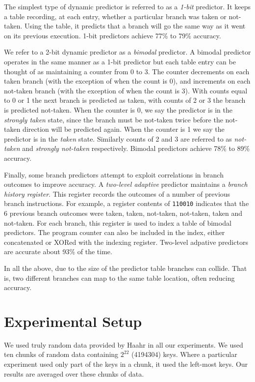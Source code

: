 \documentclass[acmtocl]{acmtrans2m}
\begin{document}
The simplest type of dynamic predictor is referred to as a \textit{1-bit}
predictor. It keeps a table recording, at each entry, whether a particular
branch was taken or not-taken.  Using the table, it predicts that a branch will
go the same way as it went on its previous execution. 1-bit predictors achieve
77\% to 79\% accuracy.

We refer to a 2-bit dynamic predictor as a \textit{bimodal} predictor. A bimodal
predictor operates in the same manner as a 1-bit predictor but each table entry
can be thought of  as maintaining a counter from 0 to 3. The counter decrements
on each taken branch (with the exception of when the count is 0), and increments
on each not-taken branch (with the exception of when the count is 3). With
counts equal to 0 or 1 the next branch is predicted as taken, with counts of 2
or 3 the branch is predicted not-taken.  When the counter is 0, we say the
predictor is in the \textit{strongly taken} state, since the branch must be
not-taken twice before the not-taken direction will be predicted again. When the
counter is 1 we say the predictor is in the \textit{taken} state. Similarly
counts of 2 and 3 are referred to as \textit{not-taken} and \textit{strongly
not-taken} respectively. Bimodal predictors achieve 78\% to 89\% accuracy.

Finally, some branch predictors attempt to exploit correlations in branch
outcomes to improve accuracy. A \textit{two-level adaptive} predictor maintains
a \textit{branch history register}. This register records the outcomes of a
number of previous branch instructions. For example, a register contents of
\texttt{110010} indicates that the 6 previous branch outcomes were taken, taken,
not-taken, not-taken, taken and not-taken.  For each branch, this register is
used to index a table of bimodal predictors.  The program counter can also be
included in the index, either concatenated or XORed with the indexing register.
Two-level adpative predictors are accurate about 93\% of the time.

In all the above, due to the size of the predictor table branches can collide.
That is, two different branches can map to the same table location, often
reducing accuracy.

\section{Experimental Setup}
 
We used truly random data provided by Haahr \citeyear{Random} in all our
experiments. We used ten chunks of random data containing $2^{22}$ (4194304)
keys.  Where a particular experiment used only part of the keys in a chunk, it
used the left-most keys.  Our results are averaged over these chunks of data.
\end{document}

